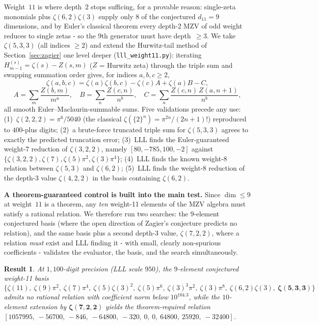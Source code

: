 \documentclass[12pt]{article}
\newtheorem{result}[theorem]{Result}
\theoremstyle{definition}
\theoremstyle{remark}
\begin{document}
Weight~$11$ is where depth~$2$ stops sufficing, for a provable
reason: single-zeta monomials plus $\zeta(6,2)\zeta(3)$ supply only
$8$ of the conjectured $d_{11}=9$ dimensions, and by Euler's
classical theorem every depth-2 MZV of odd weight reduces to single
zetas - so the $9$th generator must have depth~$\ge 3$.  We take
$\zeta(5,3,3)$ (all indices $\ge 2$) and extend the Hurwitz-tail
method of Section~\ref{sec:zagier} one level deeper
(\texttt{lll\_weight11.py}): iterating
$H^{(s)}_{m-1}=\zeta(s)-Z(s,m)$ ($Z$ = Hurwitz zeta) through the
triple sum and swapping summation order gives, for indices
$a,b,c\ge 2$,
\[
  \zeta(a,b,c) = \zeta(a)\zeta(b,c) - \zeta(c)A + \zeta(a)B - C,
\]
\[
  A=\sum_m \frac{Z(b,m)}{m^a},\quad
  B=\sum_n \frac{Z(c,n)}{n^b},\quad
  C=\sum_n \frac{Z(c,n)\,Z(a,n{+}1)}{n^b},
\]
all smooth Euler--Maclaurin-summable sums.  Five validations precede
any use: (1)~$\zeta(2,2,2)=\pi^6/5040$ (the classical
$\zeta(\{2\}^n)=\pi^{2n}/(2n{+}1)!$) reproduced to $400$-plus digits;
(2)~a brute-force truncated triple sum for $\zeta(5,3,3)$ agrees to
exactly the predicted truncation error; (3)~LLL finds the
Euler-guaranteed weight-7 reduction of $\zeta(3,2,2)$, namely
$[80,-785,100,-2]$ against
$\{\zeta(3,2,2),\zeta(7),\zeta(5)\pi^2,\zeta(3)\pi^4\}$; (4)~LLL
finds the known weight-8 relation between $\zeta(5,3)$ and
$\zeta(6,2)$; (5)~LLL finds the weight-8 reduction of the depth-3
value $\zeta(4,2,2)$ in the basis containing $\zeta(6,2)$.

\textbf{A theorem-guaranteed control is built into the main test.}
Since $\dim\le 9$ at weight~$11$ is a theorem, any \emph{ten}
weight-11 elements of the MZV algebra must satisfy a rational
relation.  We therefore run two searches: the $9$-element conjectured
basis (where the open direction of Zagier's conjecture predicts no
relation), and the same basis plus a second depth-3 value,
$\zeta(7,2,2)$, where a relation \emph{must} exist and LLL finding
it - with small, clearly non-spurious coefficients - validates the
evaluator, the basis, and the search simultaneously.

\begin{result}\label{res:weight11}
At $1{,}100$-digit precision (LLL scale $950$), the $9$-element
conjectured weight-11 basis
\[
  \{\zeta(11),\ \zeta(9)\pi^2,\ \zeta(7)\pi^4,\ \zeta(5)\zeta(3)^2,\
  \zeta(5)\pi^6,\ \zeta(3)^3\pi^2,\ \zeta(3)\pi^8,\
  \zeta(6,2)\zeta(3),\ \boldsymbol{\zeta(5,3,3)}\}
\]
admits no rational relation with coefficient norm below
$10^{104.3}$, while the $10$-element extension by
$\boldsymbol{\zeta(7,2,2)}$ yields the theorem-required relation
$[1057995,\ -56700,\ -846,\ -64800,\ -320,\ 0,\ 0,\ 64800,\ 25920,\ -32400]$.
\end{result}
\end{document}
